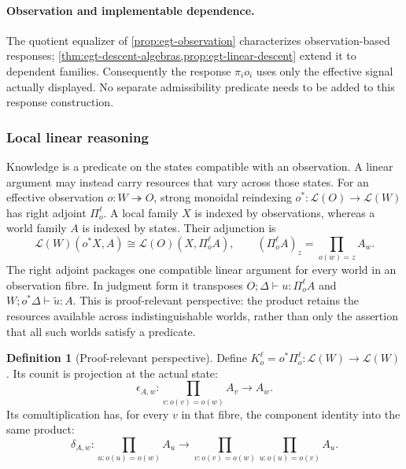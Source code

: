 \documentclass[11pt,a4paper]{article}
\numberwithin{equation}{section}
\theoremstyle{definition}
\newtheorem{definition}[theorem]{Definition}
\theoremstyle{remark}
\theoremstyle{plain}
\providecommand{\cL}{\mathcal{L}}
\begin{document}
\paragraph{Observation and implementable dependence.}
The quotient equalizer of \cref{prop:egt-observation} characterizes
observation-based responses; \cref{thm:egt-descent-algebras,prop:egt-linear-descent}
extend it to dependent families. Consequently the response
$\pi_i o_i$ uses only the effective signal actually displayed. No
separate admissibility predicate needs to be added to this response
construction.

\subsubsection{Local linear reasoning}
\label{agt-sec-perspective}

Knowledge is a predicate on the states compatible with an
observation. A linear argument may instead carry resources that vary
across those states. For an effective observation
$o:W\twoheadrightarrow O$, strong monoidal reindexing
$o^*:\cL(O)\to\cL(W)$ has right adjoint $\Pi_o^\ell$.
A local family $X$ is indexed by observations, whereas a world family
$A$ is indexed by states. Their adjunction is
\begin{equation}
 \cL(W)(o^*X,A)\cong\cL(O)(X,\Pi_o^\ell A),
 \qquad(\Pi_o^\ell A)_z=\prod_{o(w)=z}A_w.
 \label{agt-eq-perspective-adjunction}
\end{equation}
The right adjoint packages one compatible linear argument for every
world in an observation fibre. In judgment form it transposes
$O;\Delta\vdash u:\Pi_o^\ell A$ and
$W;o^*\Delta\vdash\widetilde u:A$. This is proof-relevant
perspective: the product retains the resources available across
indistinguishable worlds, rather than only the assertion that all such
worlds satisfy a predicate.

\begin{definition}[Proof-relevant perspective]
Define $K_o^\ell=o^*\Pi_o^\ell:\cL(W)\to\cL(W)$.
Its counit is projection at the actual state:
\[
 \epsilon_{A,w}:\prod_{v:o(v)=o(w)}A_v\longrightarrow A_w.
\]
Its comultiplication has, for every $v$ in that fibre, the component
identity into the same product:
\[
 \delta_{A,w}:\prod_{u:o(u)=o(w)}A_u
 \longrightarrow
 \prod_{v:o(v)=o(w)}\prod_{u:o(u)=o(v)}A_u.
\]
\end{definition}
\end{document}
